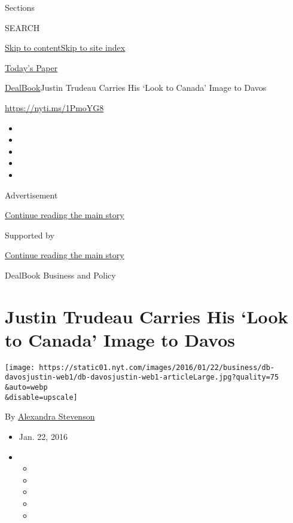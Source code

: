 Sections

SEARCH

\protect\hyperlink{site-content}{Skip to
content}\protect\hyperlink{site-index}{Skip to site index}

\href{https://myaccount.nytimes.com/auth/login?response_type=cookie\&client_id=vi}{}

\href{https://www.nytimes.com/section/todayspaper}{Today's Paper}

\href{/section/business/dealbook}{DealBook}\textbar{}Justin Trudeau
Carries His `Look to Canada' Image to Davos

\url{https://nyti.ms/1PmoYG8}

\begin{itemize}
\item
\item
\item
\item
\item
\end{itemize}

Advertisement

\protect\hyperlink{after-top}{Continue reading the main story}

Supported by

\protect\hyperlink{after-sponsor}{Continue reading the main story}

DealBook Business and Policy

\hypertarget{justin-trudeau-carries-his-look-to-canada-image-to-davos}{%
\section{Justin Trudeau Carries His `Look to Canada' Image to
Davos}\label{justin-trudeau-carries-his-look-to-canada-image-to-davos}}

\texttt{[image: https://static01.nyt.com/images/2016/01/22/business/db-davosjustin-web1/db-davosjustin-web1-articleLarge.jpg?quality=75\\\&auto=webp\\\&disable=upscale]}

By \href{http://www.nytimes.com/by/alexandra-stevenson}{Alexandra
Stevenson}

\begin{itemize}
\item
  Jan. 22, 2016
\item
  \begin{itemize}
  \item
  \item
  \item
  \item
  \item
  \end{itemize}
\end{itemize}

